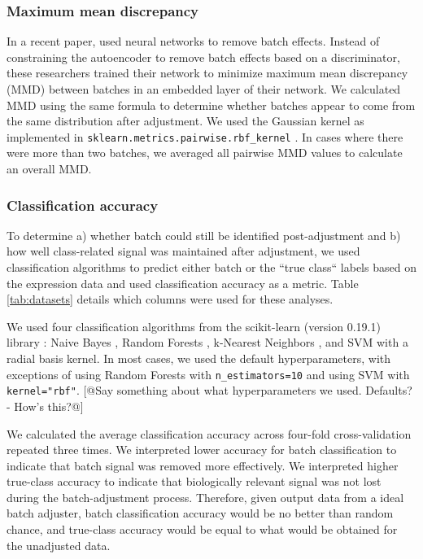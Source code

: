 \documentclass[11pt]{article}
\begin{document}
\subsubsection{Maximum mean discrepancy} \label{section:mmd}

In a recent paper, \citet{shaham_removal_2017} used neural networks to remove batch effects.
Instead of constraining the autoencoder to remove batch effects based on a discriminator, these researchers trained their network to minimize maximum mean discrepancy (MMD) between batches in an embedded layer of their network.
We calculated MMD using the same formula to determine whether batches appear to come from the same distribution after adjustment.
We used the Gaussian kernel as implemented in \texttt{sklearn.metrics.pairwise.rbf\_kernel} \cite{pedregosa_scikit-learn_2011}.
In cases where there were more than two batches, we averaged all pairwise MMD values to calculate an overall MMD.

\subsubsection{Classification accuracy}

To determine
a) whether batch could still be identified post-adjustment and
b) how well class-related signal was maintained after adjustment,
we used classification algorithms to predict either batch or the ``true class`` labels based on the expression data and used classification accuracy as a metric.
Table \ref{tab:datasets} details which columns were used for these analyses.

We used four classification algorithms from the scikit-learn (version 0.19.1) library \cite{pedregosa_scikit-learn_2011}: Naive Bayes \citep{maron_automatic_1961}, Random Forests \citep{tin_kam_ho_random_1995}, k-Nearest Neighbors \citep{fix_discriminatory_1951}, and SVM \citep{cortes_support-vector_1995} with a radial basis kernel.
In most cases, we used the default hyperparameters, with exceptions of using Random Forests with \texttt{n\_estimators=10} and using SVM with \texttt{kernel="rbf"}.
[@Say something about what hyperparameters we used. Defaults? - How's this?@]

We calculated the average classification accuracy across four-fold cross-validation repeated three times.
We interpreted lower accuracy for batch classification to indicate that batch signal was removed more effectively.
We interpreted higher true-class accuracy to indicate that biologically relevant signal was not lost during the batch-adjustment process.
Therefore, given output data from a ideal batch adjuster, batch classification accuracy would be no better than random chance, and true-class accuracy would be equal to what would be obtained for the unadjusted data.
\end{document}
